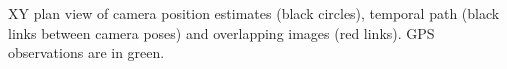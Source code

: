 XY plan view of camera position estimates (black circles), temporal path (black links between camera poses) and overlapping images (red links). GPS observations are in green.
  